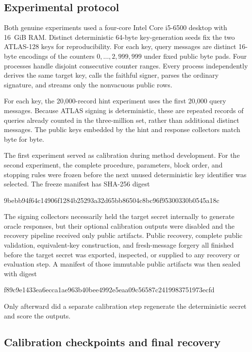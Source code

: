 \documentclass[11pt,a4paper]{article}
\newcommand{\FreezeManifestHash}{9bebb94f64c14906f1284b25293a32d65bb86504c8bc96f95300330b0545a18c}
\newcommand{\PublicOutcomeHash}{f89c9e1433ea6ecca1ae963b40bee4992e5eaa09c56587c2419983751973ecfd}
\begin{document}
\subsection{Experimental protocol}

Both genuine experiments used a four-core Intel Core i5-6500 desktop with
16~GiB RAM.  Distinct deterministic 64-byte key-generation seeds fix the two
ATLAS-128 keys for reproducibility.  For each key, query messages are distinct
16-byte encodings of the counters $0,\ldots,2{,}999{,}999$ under fixed public
byte pads.  Four processes handle disjoint consecutive counter ranges.  Every
process independently derives the same target key, calls the faithful signer,
parses the ordinary signature, and streams only the nonvacuous public rows.

For each key, the 20,000-record hint experiment uses the first 20,000 query
messages.  Because ATLAS signing is deterministic, these are repeated records
of queries already counted in the three-million set, rather than additional
distinct messages.  The public keys embedded by the hint and response
collectors match byte for byte.

The first experiment served as calibration during method development.  For
the second experiment, the complete procedure, parameters, block order, and
stopping rules were frozen before the next unused deterministic key identifier
was selected.  The freeze manifest has SHA-256 digest
\begin{center}
{\ttfamily\scriptsize \FreezeManifestHash}
\end{center}
The signing collectors necessarily held the target secret internally to
generate oracle responses, but their optional calibration outputs were
disabled and the recovery pipeline received only public artifacts.  Public
recovery, complete public validation, equivalent-key construction, and
fresh-message forgery all finished before the target secret was exported,
inspected, or supplied to any recovery or evaluation step.  A manifest of
those immutable public artifacts was then sealed with digest
\begin{center}
{\ttfamily\scriptsize \PublicOutcomeHash}
\end{center}
Only afterward did a separate calibration step regenerate the deterministic
secret and score the outputs.

\subsection{Calibration checkpoints and final recovery}
\end{document}
